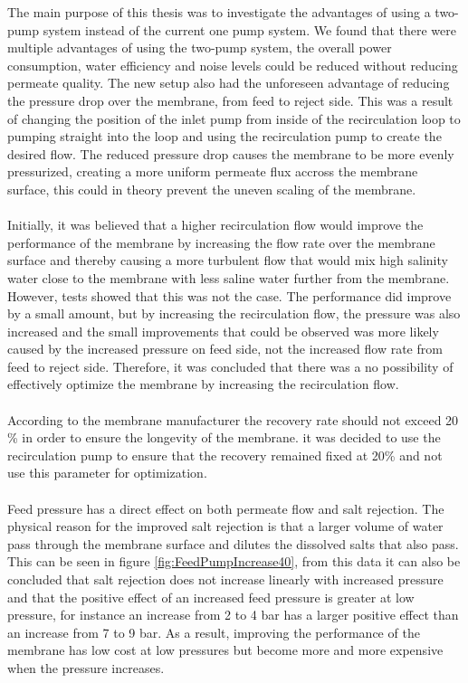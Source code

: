 The main purpose of this thesis was to investigate the advantages of using a two-pump system instead of the current one pump system. We found that there were multiple advantages of using the two-pump system, the overall power consumption, water efficiency and noise levels could be reduced without reducing permeate quality. The new setup also had the unforeseen advantage of reducing the pressure drop over the membrane, from feed to reject side. This was a result of changing the position of the inlet pump from inside of the recirculation loop to pumping straight into the loop and using the recirculation pump to create the desired flow. The reduced pressure drop causes the membrane to be more evenly pressurized, creating a more uniform permeate flux accross the membrane surface, this could in theory prevent the uneven scaling of the membrane.\\
\\
Initially, it was believed that a higher recirculation flow would improve the performance of the membrane by increasing the flow rate over the membrane surface and thereby causing a more turbulent flow that would mix high salinity water close to the membrane with less saline water further from the membrane. However, tests showed that this was not the case. The performance did improve by a small amount, but by increasing the recirculation flow, the pressure was also increased and the small improvements that could be observed was more likely caused by the increased pressure on feed side, not the increased flow rate from feed to reject side. Therefore, it was concluded that there was a no possibility of effectively optimize the membrane by increasing the recirculation flow. \\
\\
According to the membrane manufacturer the recovery rate should not exceed 20 \% in order to ensure the longevity of the membrane. it was decided to use the recirculation pump to ensure that the recovery remained fixed at 20\% and not use this parameter for optimization.\\
\\
Feed pressure has a direct effect on both permeate flow and salt rejection. The physical reason for the improved salt rejection is that a larger volume of water pass through the membrane surface and dilutes the dissolved salts that also pass. This can be seen in figure \ref{fig:FeedPumpIncrease40}, from this data it can also be concluded that salt rejection does not increase linearly with increased pressure and that the positive effect of an increased feed pressure is greater at low pressure, for instance an increase from 2 to 4 bar has a larger positive effect than an increase from 7 to 9 bar. As a result, improving the performance of the membrane has low cost at low pressures but become more and more expensive when the pressure increases.\\
